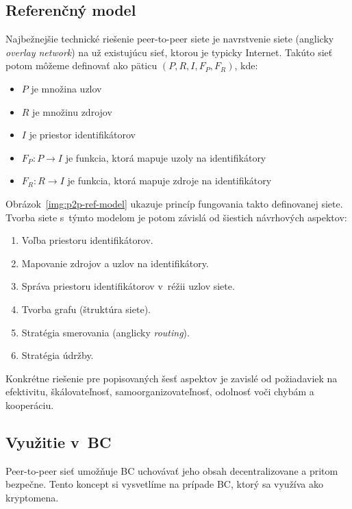 \subsection{Referenčný model}
Najbežnejšie technické riešenie peer-to-peer siete je navrstvenie siete (anglicky \textit{overlay network}) na už existujúcu sieť, ktorou je typicky Internet. Takúto sieť potom môžeme definovať ako päticu $(P,R,I,F_P,F_R)$, kde:
\begin{itemize}
	\item $P$ je množina uzlov
	\item $R$ je množinu zdrojov
	\item $I$ je priestor identifikátorov
	\item $F_P: P \rightarrow I$ je funkcia, ktorá mapuje uzoly na identifikátory
	\item $F_R: R \rightarrow I$ je funkcia, ktorá mapuje zdroje na identifikátory
\end{itemize}

Obrázok~\ref{img:p2p-ref-model} ukazuje princíp fungovania takto definovanej siete. Tvorba siete s~týmto modelom je potom závislá od šiestich návrhových aspektov:
\begin{enumerate}
	\item Voľba priestoru identifikátorov.
	\item Mapovanie zdrojov a uzlov na identifikátory.
	\item Správa priestoru identifikátorov v~réžii uzlov siete.
	\item Tvorba grafu (štruktúra siete).
	\item Stratégia smerovania (anglicky \textit{routing}).
	\item Stratégia údržby.
\end{enumerate}
Konkrétne riešenie pre popisovaných šesť aspektov je zavislé od požiadaviek na efektivitu, škálovateľnosť, samoorganizovateľnosť, odolnosť voči chybám a kooperáciu.~\cite{p2pEssence}

\subsection{Využitie v~BC}\label{subsec:bc-usage}

Peer-to-peer sieť umožňuje BC uchovávať jeho obsah decentralizovane a pritom bezpečne. Tento koncept si vysvetlíme na prípade BC, ktorý sa využíva ako kryptomena.


